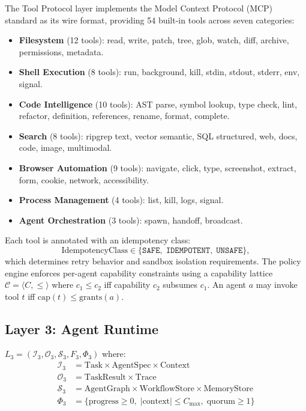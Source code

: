 The Tool Protocol layer implements the Model Context Protocol (MCP) standard
as its wire format, providing 54 built-in tools across seven categories:

\begin{itemize}[leftmargin=1.5em]
    \item \textbf{Filesystem} (12 tools): read, write, patch, tree, glob,
          watch, diff, archive, permissions, metadata.
    \item \textbf{Shell Execution} (8 tools): run, background, kill, stdin,
          stdout, stderr, env, signal.
    \item \textbf{Code Intelligence} (10 tools): AST parse, symbol lookup,
          type check, lint, refactor, definition, references, rename, format, complete.
    \item \textbf{Search} (8 tools): ripgrep text, vector semantic, SQL
          structured, web, docs, code, image, multimodal.
    \item \textbf{Browser Automation} (9 tools): navigate, click, type,
          screenshot, extract, form, cookie, network, accessibility.
    \item \textbf{Process Management} (4 tools): list, kill, logs, signal.
    \item \textbf{Agent Orchestration} (3 tools): spawn, handoff, broadcast.
\end{itemize}

Each tool is annotated with an idempotency class:
\begin{equation}
    \text{IdempotencyClass} \in \{\texttt{SAFE},\; \texttt{IDEMPOTENT},\;
                                   \texttt{UNSAFE}\},
\end{equation}
which determines retry behavior and sandbox isolation requirements. The policy
engine enforces per-agent capability constraints using a capability lattice
$\mathcal{C} = \langle C, \leq \rangle$ where $c_1 \leq c_2$ iff capability
$c_2$ subsumes $c_1$. An agent $a$ may invoke tool $t$ iff $\text{cap}(t) \leq
\text{grants}(a)$.

\subsection{Layer 3: Agent Runtime}

\begin{definition}
    $L_3 = \left(\mathcal{I}_3, \mathcal{O}_3, \mathcal{S}_3, F_3, \Phi_3\right)$ where:
    \begin{align*}
        \mathcal{I}_3 &= \text{Task} \times \text{AgentSpec} \times \text{Context} \\
        \mathcal{O}_3 &= \text{TaskResult} \times \text{Trace} \\
        \mathcal{S}_3 &= \text{AgentGraph} \times \text{WorkflowStore} \times
                         \text{MemoryStore} \\
        \Phi_3 &= \{\text{progress} \geq 0,\; |\text{context}| \leq C_{\max},\;
                    \text{quorum} \geq 1\}
    \end{align*}
\end{definition}

